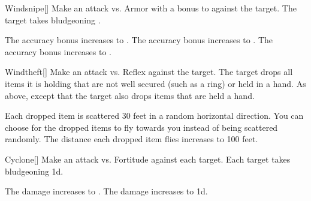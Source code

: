 \lowercase{\hypertarget{spell:Windsnipe}{}}\label{spell:Windsnipe}
\begin{freeability}[Rank 2]{\hypertarget{spell:Windsnipe}{Windsnipe}}[]
Make an attack vs. Armor with a  bonus to  against the target.
\hit The target takes bludgeoning .

\rankline
{} The accuracy bonus increases to .
 The accuracy bonus increases to .
 The accuracy bonus increases to .

\end{freeability}
\vspace{0.25em}



\lowercase{\hypertarget{spell:Windtheft}{}}\label{spell:Windtheft}
\begin{freeability}[Rank 2]{\hypertarget{spell:Windtheft}{Windtheft}}[]
Make an attack vs. Reflex against the target.
\hit The target drops all items it is holding that are not well secured (such as a ring) or held in a hand.
\crit As above, except that the target also drops items that are held a hand.

\rankline
{} Each dropped item is scattered 30 feet in a random horizontal direction.
 You can choose for the dropped items to fly towards you instead of being scattered randomly.
 The distance each dropped item flies increases to 100 feet.

\end{freeability}
\vspace{0.25em}



\lowercase{\hypertarget{spell:Cyclone}{}}\label{spell:Cyclone}
\begin{freeability}[Rank 3]{\hypertarget{spell:Cyclone}{Cyclone}}[]
Make an attack vs. Fortitude against each target.
\hit Each target takes bludgeoning  \minus1d.

\rankline
{} The damage increases to .
 The damage increases to  \plus1d.

\end{freeability}
\vspace{0.25em}



